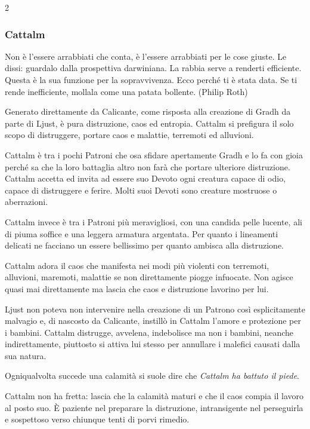 \begin{multicols}{2}
\subsubsection{Cattalm}\label{cattalm}\hypertarget{cattalm}{}

\begin{enfasi}{
Non è l'essere arrabbiati che conta, è l'essere arrabbiati per le cose giuste. Le dissi: guardalo dalla prospettiva darwiniana. La rabbia serve a renderti efficiente. Questa è la sua funzione per la sopravvivenza. Ecco perché ti è stata data. Se ti rende inefficiente, mollala come una patata bollente. (Philip Roth)
}\end{enfasi}

Generato direttamente da Calicante, come risposta alla creazione di Gradh da parte di Ljust, è pura distruzione, caos ed entropia. Cattalm si prefigura il solo scopo di distruggere, portare caos e malattie, terremoti ed alluvioni.

Cattalm è tra i pochi Patroni che osa sfidare apertamente Gradh e lo fa con gioia perché sa che la loro battaglia altro non farà che portare ulteriore distruzione. Cattalm accetta ed invita ad essere suo Devoto ogni creatura capace di odio, capace di distruggere e ferire. Molti suoi Devoti sono creature mostruose o aberrazioni.

Cattalm invece è tra i Patroni più meravigliosi, con una candida pelle lucente, ali di piuma soffice e una leggera armatura argentata. Per quanto i lineamenti delicati ne facciano un essere bellissimo per quanto ambisca alla distruzione.

Cattalm adora il caos che manifesta nei modi più violenti con terremoti, alluvioni, maremoti, malattie se non direttamente piogge infuocate. Non agisce quasi mai direttamente ma lascia che caos e distruzione lavorino per lui.

Ljust non poteva non intervenire nella creazione di un Patrono così esplicitamente malvagio e, di nascosto da Calicante, instillò in Cattalm l'amore e protezione per i bambini. Cattalm distrugge, avvelena, indebolisce ma non i bambini, neanche indirettamente, piuttosto si attiva lui stesso per annullare i malefici causati dalla sua natura.

Ogniqualvolta succede una calamità si suole dire che \emph{Cattalm ha battuto il piede}.

Cattalm non ha fretta: lascia che la calamità maturi e che il caos compia il lavoro al posto suo. È paziente nel preparare la distruzione, intransigente nel perseguirla e sospettoso verso chiunque tenti di porvi rimedio.


\end{multicols}
